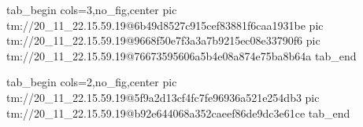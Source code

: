  
 
 
 
 

\qqSecCmtScr


\ifcmt
  tab_begin cols=3,no_fig,center
    pic tm://20_11_22.15.59.19@6b49d8527c915cef83881f6caa1931be
    pic tm://20_11_22.15.59.19@9668f50e7f3a3a7b9215ec08e33790f6
    pic tm://20_11_22.15.59.19@76673595606a5b4e08a874e75ba8b64a
  tab_end
\fi


\ifcmt
  tab_begin cols=2,no_fig,center
    pic tm://20_11_22.15.59.19@5f9a2d13cf4fc7fe96936a521e254db3
    pic tm://20_11_22.15.59.19@b92e644068a352caeef86de9dc3e61ce
  tab_end
\fi

